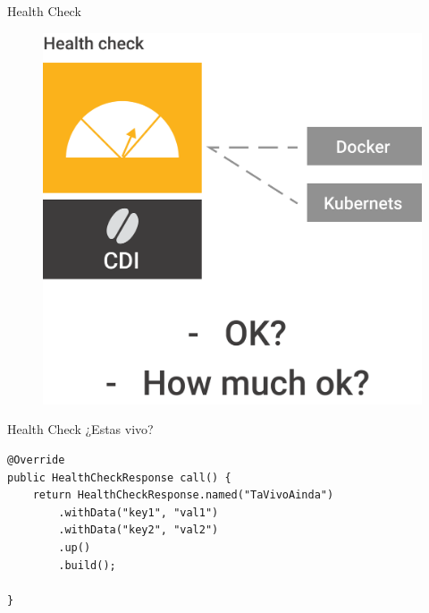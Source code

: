 \documentclass{beamer}
\begin{document}





\begin{frame}{Health Check}
\begin{figure}
	\centering
	\includegraphics[width=0.75\linewidth]{Images/healthcheck}
\end{figure}
\end{frame}

\begin{frame}[fragile]{Health Check}
¿Estas vivo?
\begin{lstlisting}
@Override
public HealthCheckResponse call() {
	return HealthCheckResponse.named("TaVivoAinda")
		.withData("key1", "val1")
		.withData("key2", "val2")
		.up()
		.build();

}
\end{lstlisting}

\end{frame}
\end{document}
